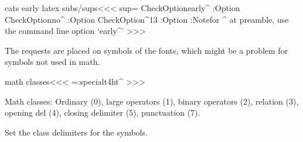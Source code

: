 {{{{{{{{\<cats early latex subs/sups\><<<
\let\early:sup=\empty
\:CheckOption{early^} \if:Option
   \:CheckOption{no^} \if:Option \else
      \:CheckOption{^13} \if:Option
           \def\early:sup{%
               \xdef\recall:sup{%
                  \mathcode`\noexpand\^=\the\mathcode`\^
                  \catcode`\noexpand\^=\the\catcode`\^
               }
              \mathcode`\^="8000 \catcode`\^=13 
          }
      \else
           \def\early:sup{%
               \xdef\recall:sup{%
                  \mathcode`\noexpand\^=\the\mathcode`\^
                  \catcode`\noexpand\^=\the\catcode`\^
               }%
              \mathcode`\^="8000 \catcode`\^=12
          }
      \fi
   \fi
\else 
   \Log:Note{for \string^ at preamble, 
          use the command line option `early\string^'}%
\fi
>>>







The requests are placed on symbols of the fonts, which might be a
problem for symbols  not used in math.

\<math classes\><<<
\def\MathClass{\ht:special{t4ht\string^}}
\let\EndMathClass|=\MathClass
\def\PauseMathClass{\ht:special{t4ht\string^-}}
\def\EndPauseMathClass{\ht:special{t4ht\string^+}}
>>>




Math classes: Ordinary (0), large operators (1), binary operators (2),
relation (3), opening del (4), closing delimiter (5),
punctuation (7).





Set the class delimiters for the symbols.

}}}}}}}}
